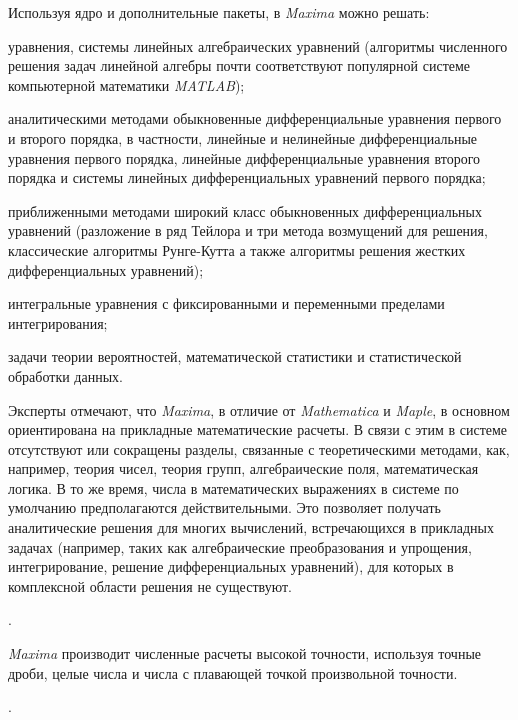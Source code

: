 Используя ядро и дополнительные пакеты, в \textit{Maxima} можно решать:
\begin{textitemize}
	\item уравнения, системы линейных алгебраических уравнений (алгоритмы численного решения задач линейной алгебры почти соответствуют популярной системе компьютерной математики \textit{MATLAB});
	\item аналитическими методами обыкновенные дифференциальные уравнения первого и второго порядка, в частности, линейные и нелинейные дифференциальные уравнения первого порядка, линейные дифференциальные уравнения второго порядка и системы линейных дифференциальных уравнений первого порядка;
	\item приближенными методами широкий класс обыкновенных дифференциальных уравнений (разложение в ряд Тейлора и три метода возмущений для решения, классические алгоритмы Рунге-Кутта а также алгоритмы решения жестких дифференциальных уравнений);
	\item интегральные уравнения с фиксированными и переменными пределами интегрирования;
	\item задачи теории вероятностей, математической статистики и статистической обработки данных.
\end{textitemize}

Эксперты отмечают, что \textit{Maxima}, в отличие от \textit{Mathematica} и \textit{Maple}, в основном ориентирована на прикладные математические расчеты. В связи с этим в системе отсутствуют или сокращены разделы, связанные с теоретическими методами, как, например, теория чисел, теория групп, алгебраические поля, математическая логика. В то же время, числа в математических выражениях в системе по умолчанию предполагаются действительными. Это позволяет получать аналитические решения для многих вычислений, встречающихся в прикладных задачах (например, таких как алгебраические преобразования и упрощения, интегрирование, решение дифференциальных уравнений), для которых в комплексной области решения не существуют.

. 

\textit{Maxima} производит численные расчеты высокой точности, используя точные дроби, целые числа и числа с плавающей точкой произвольной точности.

. 


